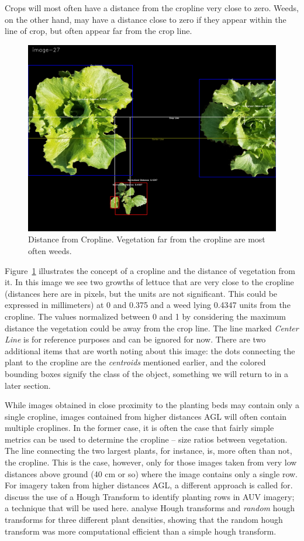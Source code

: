 \documentclass[letterpaper]{article}
\begin{document}
{Crops will most often have a distance from the cropline very close to zero. Weeds, on the other hand, may have a distance close to zero if they appear within the line of crop, but often appear far from the crop line.
\begin{figure}[h!]
	\centering
	\includegraphics[width=0.4\linewidth]{./figures/normalized-distance.jpg}
	\caption[Distance from Cropline]{Distance from Cropline. Vegetation far from the cropline are most often weeds.}
	\label{fig:normalized-distance}
\end{figure}
Figure~\ref{fig:normalized-distance} illustrates the concept of a cropline and the distance of vegetation from it. In this image we see two growths of lettuce that are very close to the cropline (distances here are in pixels, but the units are not significant. This could be expressed in millimeters) at 0 and 0.375 and a weed lying 0.4347 units from the cropline. The values normalized between 0 and 1 by considering the maximum distance the vegetation could be away from the crop line. The line marked \textit{Center Line} is for reference purposes and can be ignored for now.  There are two additional items that are worth noting about this image: the dots connecting the plant to the cropline are the {\it centroids} mentioned earlier, and the colored bounding boxes signify the class of the object, something we will return to in a later section.

While images obtained in close proximity to the planting beds may contain only a single cropline, images contained from higher distances AGL will often contain multiple croplines. In the former case, it is often the case that fairly simple metrics can be used to determine the cropline -- size ratios between vegetation.  The line connecting the two largest plants, for instance, is, more often than not, the cropline. This is the case, however, only for those images taken from very low distances above ground (40 cm or so) where the image contains only a single row. For imagery taken from higher distances AGL, a different approach is called for. \citeauthor*{Dian_Bah2017-kd} discuss the use of a Hough Transform \parencite{Illingworth1988-nw} to identify planting rows in AUV imagery; a technique that will be used here. \citeauthor{Ji2011-qb} analyse Hough transforms and \textit{random} hough transforms \parencite{Ji2011-qb} for three different plant densities, showing that the random hough transform was more computational efficient than a simple hough transform.

}
\end{document}
